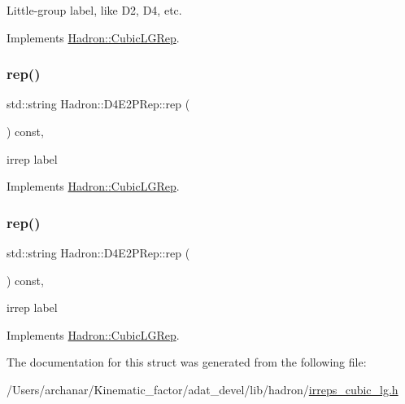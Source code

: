 Little-\/group label, like D2, D4, etc. 

Implements \mbox{\hyperlink{structHadron_1_1CubicLGRep_a9bdb14b519a611d21379ed96a3a9eb41}{Hadron\+::\+Cubic\+L\+G\+Rep}}.

\mbox{\label{structHadron_1_1D4E2PRep_a9cabd3c1f3fd0325a694d960a363e8b2}} 
\subsubsection{\texorpdfstring{rep()}{rep()}\hspace{0.1cm}{\footnotesize\ttfamily [1/2]}}
{\footnotesize\ttfamily std\+::string Hadron\+::\+D4\+E2\+P\+Rep\+::rep (\begin{DoxyParamCaption}{ }\end{DoxyParamCaption}) const\hspace{0.3cm}{\ttfamily [inline]}, {\ttfamily [virtual]}}

irrep label 

Implements \mbox{\hyperlink{structHadron_1_1CubicLGRep_a50f5ddbb8f4be4cee0106fa9e8c75e6c}{Hadron\+::\+Cubic\+L\+G\+Rep}}.

\mbox{\label{structHadron_1_1D4E2PRep_a9cabd3c1f3fd0325a694d960a363e8b2}} 
\subsubsection{\texorpdfstring{rep()}{rep()}\hspace{0.1cm}{\footnotesize\ttfamily [2/2]}}
{\footnotesize\ttfamily std\+::string Hadron\+::\+D4\+E2\+P\+Rep\+::rep (\begin{DoxyParamCaption}{ }\end{DoxyParamCaption}) const\hspace{0.3cm}{\ttfamily [inline]}, {\ttfamily [virtual]}}

irrep label 

Implements \mbox{\hyperlink{structHadron_1_1CubicLGRep_a50f5ddbb8f4be4cee0106fa9e8c75e6c}{Hadron\+::\+Cubic\+L\+G\+Rep}}.



The documentation for this struct was generated from the following file\+:\begin{DoxyCompactItemize}
\item 
/\+Users/archanar/\+Kinematic\+\_\+factor/adat\+\_\+devel/lib/hadron/\mbox{\hyperlink{lib_2hadron_2irreps__cubic__lg_8h}{irreps\+\_\+cubic\+\_\+lg.\+h}}\end{DoxyCompactItemize}

